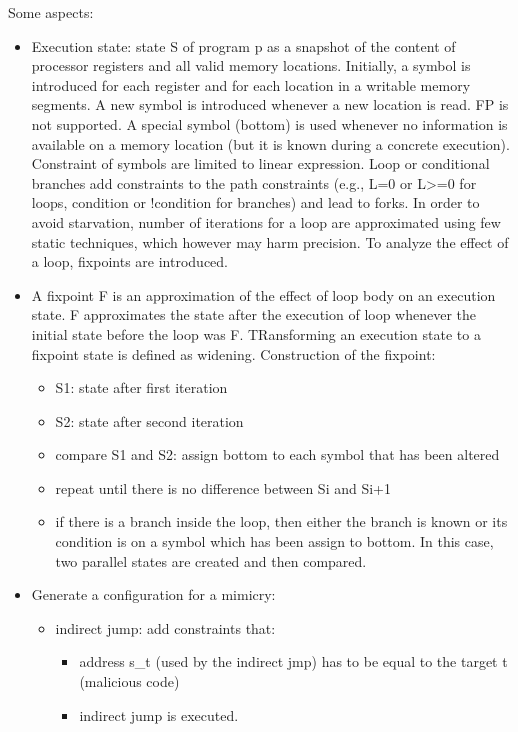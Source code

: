 \documentclass[10pt, a4paper]{article}
\begin{document}
Some aspects:
\begin{itemize}
  \item Execution state: state S of program p as a snapshot of the content of processor registers and all valid memory locations. Initially, a symbol is introduced for each register and for each location in a writable memory segments. A new symbol is introduced whenever a new location is read. FP is not supported. A special symbol (bottom) is used whenever no information is available on a memory location (but it is known during a concrete execution). Constraint of symbols are limited to linear expression. Loop or conditional branches add constraints to the path constraints (e.g., L=0 or L>=0 for loops, condition or !condition for branches) and lead to forks. In order to avoid starvation, number of iterations for a loop are approximated using few static techniques, which however may harm precision. To analyze the effect of a loop, fixpoints are introduced.
  \item A fixpoint F is an approximation of the effect of loop body on an execution state. F approximates the state after the execution of loop whenever the initial state before the loop was F. TRansforming an execution state to a fixpoint state is defined as widening. Construction of the fixpoint:
  \begin{itemize}
    \item S1: state after first iteration
    \item S2: state after second iteration
    \item compare S1 and S2: assign bottom to each symbol that has been altered
    \item repeat until there is no difference between Si and Si+1
    \item if there is a branch inside the loop, then either the branch is known or its condition is on a symbol which has been assign to bottom. In this case, two parallel states are created and then compared.
  \end{itemize}
  \item Generate a configuration for a mimicry:
  \begin{itemize}
    \item indirect jump: add constraints that:
      \begin{itemize}
        \item address s\_t (used by the indirect jmp) has to be equal to the target t (malicious code)
        \item indirect jump is executed.
      \end{itemize}

\end{itemize}
\end{itemize}
\end{document}
